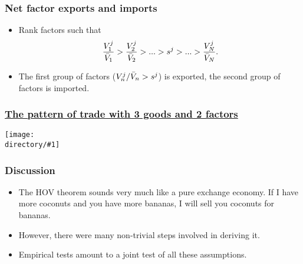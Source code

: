 \documentclass[compress,mathserif,aspectratio=169]{beamer}
\newcommand{\directory}{figures}
\newcommand{\widefigure}[2]{\begin{frame}\frametitle{\hyperlink{#1back}{#2}}\hypertarget{#1}{{\begin{center}\texttt{[image: \\directory/\#1]}\end{center}}}\end{frame}}
\begin{document}
\begin{frame}\frametitle{Net factor exports and imports}\hypertarget{Net factor exports and imports}{}
\begin{itemize}
\item Rank factors such that
\[
\frac{V_1^j}{\Bar V_1} > \frac{V_2^j}{\Bar V_2} > ...>s^j>...>
\frac{V_N^j}{\Bar V_N}.
\]

\item The first group of factors (${V_n^j}/{\Bar V_n}>s^j$) is exported, the second group of factors is imported.


\end{itemize}
\end{frame}




\widefigure{HK1-4}{The pattern of trade with 3 goods and 2 factors}




\begin{frame}\frametitle{Discussion}\hypertarget{Discussion}{}
\begin{itemize}
\item The HOV theorem sounds very much like a pure exchange economy. If I have more coconuts and you have more bananas, I will sell you coconuts for bananas.

\item However, there were many non-trivial steps involved in deriving it.

\item Empirical tests amount to a joint test of all these assumptions.








\end{itemize}
\end{frame}
\end{document}
